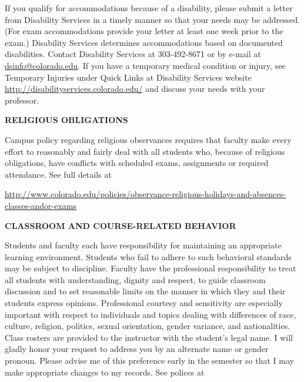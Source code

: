 \documentclass[11pt]{article}
\begin{document}
\small
If you qualify for accommodations because of a disability, please
submit a letter from Disability Services in a timely manner so
that your needs may be addressed.  (For exam accommodations provide your letter at least one week prior to the exam.)  Disability Services determines
accommodations based on documented disabilities.  Contact Disability 
Services at 303-492-8671 or by e-mail at \url{dsinfo@colorado.edu}.
If you have a temporary medical condition or injury, see Temporary Injuries under Quick Links at
Disability Services website {\footnotesize \url{http://disabilityservices.colorado.edu/}} and discuss your needs with your professor.


\bigskip

\textbf{\normalsize RELIGIOUS OBLIGATIONS}



Campus policy regarding religious observances requires that faculty
make every effort to reasonably and fairly deal with all students
who, because of religious obligations, have conflicts with scheduled
exams, assignments or required attendance.  See full
details at

{\footnotesize \noindent \url{http://www.colorado.edu/policies/observance-religious-holidays-and-absences-classes-andor-exams} }


\bigskip

\textbf{\normalsize  CLASSROOM AND COURSE-RELATED BEHAVIOR}

Students and faculty each have responsibility for maintaining an
appropriate learning environment. Students who fail to adhere to
such behavioral standards may be subject to discipline. Faculty have
the professional responsibility to treat all students with
understanding, dignity and respect, to guide classroom discussion
and to set reasonable limits on the manner in which they and their
students express opinions.  Professional courtesy and sensitivity
are especially important with respect to individuals and topics
dealing with differences of race, culture, religion, politics,
sexual orientation, gender variance, and nationalities.  Class
rosters are provided to the instructor with the student's legal
name. I will gladly honor your request to address you by an
alternate name or gender pronoun. Please advise me of this
preference early in the semester so that I may make appropriate
changes to my records.  See polices at
\end{document}
